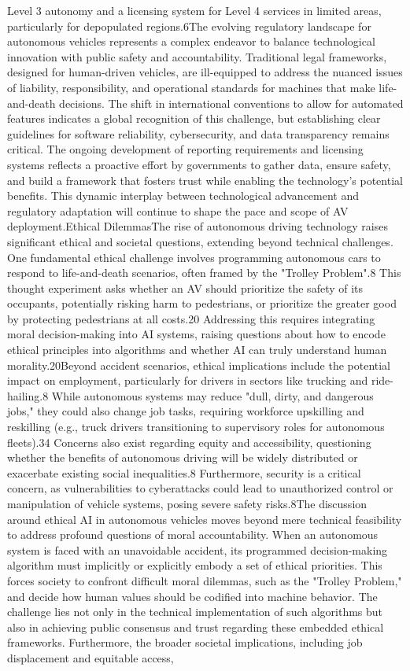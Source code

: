 Level 3 autonomy and a licensing system for Level 4 services in limited areas, particularly for depopulated regions.6The evolving regulatory landscape for autonomous vehicles represents a complex endeavor to balance technological innovation with public safety and accountability. Traditional legal frameworks, designed for human-driven vehicles, are ill-equipped to address the nuanced issues of liability, responsibility, and operational standards for machines that make life-and-death decisions. The shift in international conventions to allow for automated features indicates a global recognition of this challenge, but establishing clear guidelines for software reliability, cybersecurity, and data transparency remains critical. The ongoing development of reporting requirements and licensing systems reflects a proactive effort by governments to gather data, ensure safety, and build a framework that fosters trust while enabling the technology's potential benefits. This dynamic interplay between technological advancement and regulatory adaptation will continue to shape the pace and scope of AV deployment.Ethical DilemmasThe rise of autonomous driving technology raises significant ethical and societal questions, extending beyond technical challenges. One fundamental ethical challenge involves programming autonomous cars to respond to life-and-death scenarios, often framed by the "Trolley Problem".8 This thought experiment asks whether an AV should prioritize the safety of its occupants, potentially risking harm to pedestrians, or prioritize the greater good by protecting pedestrians at all costs.20 Addressing this requires integrating moral decision-making into AI systems, raising questions about how to encode ethical principles into algorithms and whether AI can truly understand human morality.20Beyond accident scenarios, ethical implications include the potential impact on employment, particularly for drivers in sectors like trucking and ride-hailing.8 While autonomous systems may reduce "dull, dirty, and dangerous jobs," they could also change job tasks, requiring workforce upskilling and reskilling (e.g., truck drivers transitioning to supervisory roles for autonomous fleets).34 Concerns also exist regarding equity and accessibility, questioning whether the benefits of autonomous driving will be widely distributed or exacerbate existing social inequalities.8 Furthermore, security is a critical concern, as vulnerabilities to cyberattacks could lead to unauthorized control or manipulation of vehicle systems, posing severe safety risks.8The discussion around ethical AI in autonomous vehicles moves beyond mere technical feasibility to address profound questions of moral accountability. When an autonomous system is faced with an unavoidable accident, its programmed decision-making algorithm must implicitly or explicitly embody a set of ethical priorities. This forces society to confront difficult moral dilemmas, such as the "Trolley Problem," and decide how human values should be codified into machine behavior. The challenge lies not only in the technical implementation of such algorithms but also in achieving public consensus and trust regarding these embedded ethical frameworks. Furthermore, the broader societal implications, including job displacement and equitable access, 